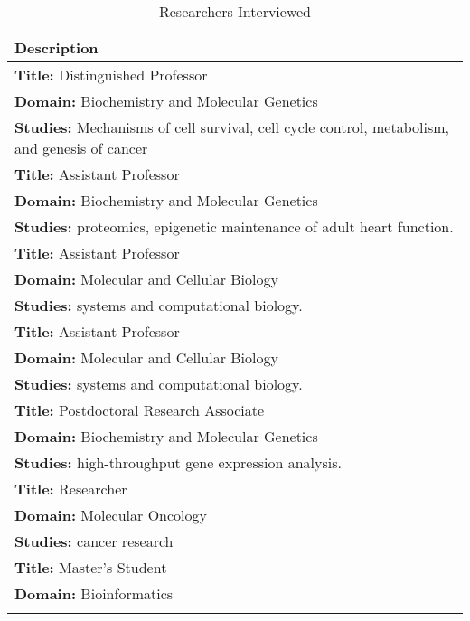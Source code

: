 \documentclass[twocolumn]{bmcart}%
\begin{document}
\newcommand\T{\rule{0pt}{2.6ex}}
\newcommand\B{\rule[-1.2ex]{0pt}{0pt}}
\begin{table}[!ht]
 \caption{Researchers Interviewed}
 \begin{center}
   \begin{tabular}{p{6.5cm}}
     Description \\
     \hline \textbf{Title:} Distinguished Professor \T \\
     \textbf{Domain:} Biochemistry and Molecular Genetics \\
     \textbf{Studies:} Mechanisms of cell survival, cell cycle control, metabolism, and genesis of cancer \B
     \\ %
     \hline \textbf{Title:} Assistant Professor \T \\
     \textbf{Domain:} Biochemistry and Molecular Genetics \\
     \textbf{Studies:} proteomics, epigenetic maintenance of adult heart function. \B
     \\ %
     \hline \textbf{Title:} Assistant Professor \T \\
     \textbf{Domain:} Molecular and Cellular Biology \\
     \textbf{Studies:} systems and computational biology. \B
     \\ %
     \hline \textbf{Title:} Assistant Professor \T \\
     \textbf{Domain:} Molecular and Cellular Biology \\
     \textbf{Studies:} systems and computational biology. \B
     \\ %
     \hline \textbf{Title:} Postdoctoral Research Associate \T \\
     \textbf{Domain:} Biochemistry and Molecular Genetics \\
     \textbf{Studies:} high-throughput gene expression analysis. \B
     \\ %
     \hline \textbf{Title:} Researcher \T \\
     \textbf{Domain:} Molecular Oncology \\
     \textbf{Studies:} cancer research \B
     \\ %
     \hline \textbf{Title:} Master's Student \T \\
     \textbf{Domain:} Bioinformatics \B
     \\ %
    \label{table:interviews}
   \end{tabular}
 \end{center}
\end{table}
\end{document}
